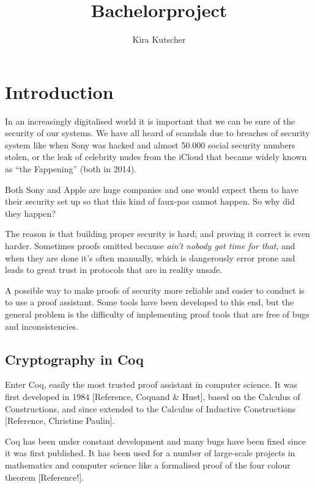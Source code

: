 \documentclass[titlepage]{article}
\title{Bachelorproject}
\author{Kira Kutscher}
\begin{document}
\maketitle

\newcommand\rml{$\mathcal{R}$\texttt{ml} }
\newcommand\M{\texttt{M}}



\section{Introduction}
In an increasingly digitalised world it is important that we can be sure of the
security of our systems. We have all heard of scandals due to breaches of security
system like when Sony was hacked and almost 50.000 social security numbers stolen, or
the leak of celebrity nudes from the iCloud that became widely known as ``the
Fappening'' (both in 2014).

Both Sony and Apple are huge companies and one would expect them to have their
security set up so that this kind of faux-pas cannot happen. So why did they happen?

The reason is that building proper security is hard; and proving it correct is even
harder. Sometimes proofs omitted because \textit{ain't nobody got time for that}, and
when they are done it's often manually, which is dangerously error prone and leads to
great trust in protocols that are in reality unsafe.

A possible way to make proofs of security more reliable and easier to conduct is to
use a proof assistant. Some tools have been developed to this end, but the general
problem is the difficulty of implementing proof tools that are free of bugs and
inconsistencies. 

\subsection{Cryptography in Coq}
Enter Coq, easily the most trusted proof assistant in computer science. It was first
developed in 1984 [Reference, Coquand \& Huet], based on the Calculus of
Constructions, and since extended to the Calculus of Inductive Constructions
[Reference, Christine Paulin].

Coq has been under constant development and many bugs have been fixed since it was
first published. It has been used for a number of large-scale projects in mathematics
and computer science like a formalised proof of the four colour theorem
[Reference!].
\end{document}
